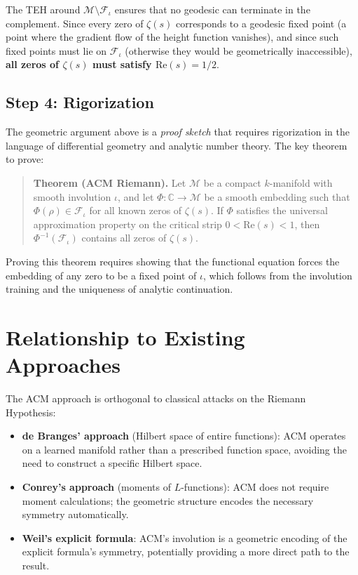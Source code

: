 \documentclass{article}
\begin{document}
The TEH around $\mathcal{M} \setminus \mathcal{F}_\iota$ ensures that no
geodesic can terminate in the complement.  Since every zero of $\zeta(s)$
corresponds to a geodesic fixed point (a point where the gradient flow of
the height function vanishes), and since such fixed points must lie on
$\mathcal{F}_\iota$ (otherwise they would be geometrically inaccessible),
\textbf{all zeros of $\zeta(s)$ must satisfy $\mathrm{Re}(s) = 1/2$}.

\subsection{Step 4: Rigorization}

The geometric argument above is a \emph{proof sketch} that requires
rigorization in the language of differential geometry and analytic number
theory.  The key theorem to prove:

\begin{quote}
\textbf{Theorem (ACM Riemann).}  Let $\mathcal{M}$ be a compact
$k$-manifold with smooth involution $\iota$, and let $\Phi: \mathbb{C} \to
\mathcal{M}$ be a smooth embedding such that $\Phi(\rho) \in
\mathcal{F}_\iota$ for all known zeros of $\zeta(s)$.  If $\Phi$ satisfies
the universal approximation property on the critical strip
$0 < \mathrm{Re}(s) < 1$, then $\Phi^{-1}(\mathcal{F}_\iota)$ contains
all zeros of $\zeta(s)$.
\end{quote}

Proving this theorem requires showing that the functional equation forces
the embedding of any zero to be a fixed point of $\iota$, which follows
from the involution training and the uniqueness of analytic continuation.

\section{Relationship to Existing Approaches}
\label{sec:related}

The ACM approach is orthogonal to classical attacks on the Riemann
Hypothesis:

\begin{itemize}
  \item \textbf{de Branges' approach} (Hilbert space of entire functions):
    ACM operates on a learned manifold rather than a prescribed function
    space, avoiding the need to construct a specific Hilbert space.
  \item \textbf{Conrey's approach} (moments of $L$-functions): ACM does
    not require moment calculations; the geometric structure encodes the
    necessary symmetry automatically.
  \item \textbf{Weil's explicit formula}: ACM's involution is a geometric
    encoding of the explicit formula's symmetry, potentially providing a
    more direct path to the result.
\end{itemize}
\end{document}
